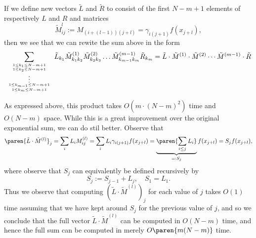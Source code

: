 \documentclass[onecolumn,amsmath,amssymb,nofootinbib,floatfix]{revtex4}
\begin{document}
If we define new vectors $\tilde L$ and $\tilde R$ to consist of the first $N-m+1$ elements of respectively $L$ and $R$ and matrices
$$
\tilde M^{l}_{ij} := M_{(i+(l-1))(j+l)}= \gamma_{i(j+1)}f(x_{j+l}),
$$
then we see that we can rewite the sum above in the form
$$
\sum_{
1\le k_1\le N-m+1 \atop {
1\le k_2\le N-m+1 \atop {
\vdots \atop {
1\le k_{m-1}\le N-m+1 \atop {
1\le k_m\le N-m+1
}}}}}
\tilde L_{k_1}\tilde M^{(1)}_{k_1k_2}\tilde M^{(2)}_{k_2k_3}\dots \tilde M^{(m-1)}_{k_{m-1}k_m} \tilde R_{k_m}
=\tilde L \cdot \tilde M^{(1)}\cdot \tilde M^{(2)} \cdots \tilde M^{(m-1)}\cdot \tilde R
$$

As expressed above, this product takes $O(m\cdot (N-m)^2)$ time and $O(N-m)$ space.  While this is a great improvement over the original exponential sum, we can do stil better.  Observe that
$$\paren{\tilde L\cdot \tilde M^{(l)}}_j
= \sum_i L_i M^{(l)}_{ij}
= \sum_i L_i \gamma_{i(j+1)} f(x_{j+l})
= \underbrace{\paren{\sum_{i\le j} L_i }}_{=:S_j} f(x_{j+l})
= S_j f(x_{j+l}),$$
where observe that $S_j$ can equivalently be defined recursively by
$$S_j := S_{j-1}+L_j,\quad S_1 = L_1.$$
Thus we observe that computing $(\tilde L\cdot \tilde M^{(l)})_j$ for each value of $j$ takes $O(1)$ time assuming that we have kept around $S_j$ for the previous value of $j$, and so we conclude that the full vector $\tilde L\cdot \tilde M^{(l)}$ can be computed in $O(N-m)$ time, and hence the full sum can be computed in merely $O\paren{m(N-m)}$ time.
\end{document}
